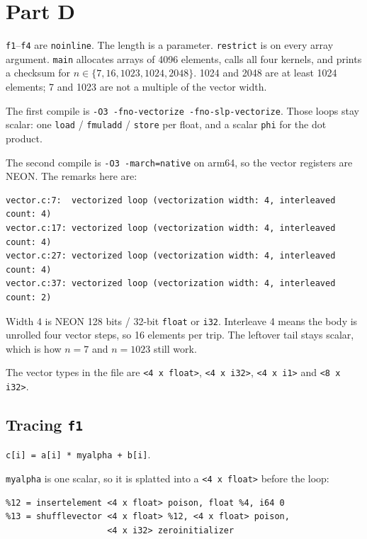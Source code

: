 \documentclass[11pt,a4paper]{article}
\begin{document}
\section{Part D}

\texttt{f1}--\texttt{f4} are \texttt{noinline}. The length is a parameter.
\texttt{restrict} is on every array argument. \texttt{main} allocates
arrays of 4096 elements, calls all four kernels, and prints a checksum
for $n \in \{7,16,1023,1024,2048\}$. 1024 and 2048 are at least 1024
elements; 7 and 1023 are not a multiple of the vector width.

The first compile is
\texttt{-O3 -fno-vectorize -fno-slp-vectorize}. Those loops stay scalar:
one \texttt{load} / \texttt{fmuladd} / \texttt{store} per float, and a
scalar \texttt{phi} for the dot product.

The second compile is
\texttt{-O3 -march=native} on arm64, so the vector registers are NEON.
The remarks here are:

\begin{lstlisting}[language={}]
vector.c:7:  vectorized loop (vectorization width: 4, interleaved count: 4)
vector.c:17: vectorized loop (vectorization width: 4, interleaved count: 4)
vector.c:27: vectorized loop (vectorization width: 4, interleaved count: 4)
vector.c:37: vectorized loop (vectorization width: 4, interleaved count: 2)
\end{lstlisting}

Width 4 is NEON 128 bits / 32-bit \texttt{float} or \texttt{i32}.
Interleave 4 means the body is unrolled four vector steps, so 16 elements
per trip. The leftover tail stays scalar, which is how $n=7$ and $n=1023$
still work.

The vector types in the file are \texttt{<4 x float>}, \texttt{<4 x i32>},
\texttt{<4 x i1>} and \texttt{<8 x i32>}.

\subsection*{Tracing \texttt{f1}}

\texttt{c[i] = a[i] * myalpha + b[i]}.

\texttt{myalpha} is one scalar, so it is splatted into a
\texttt{<4 x float>} before the loop:

\begin{lstlisting}
%12 = insertelement <4 x float> poison, float %4, i64 0
%13 = shufflevector <4 x float> %12, <4 x float> poison,
                    <4 x i32> zeroinitializer
\end{lstlisting}
\end{document}
